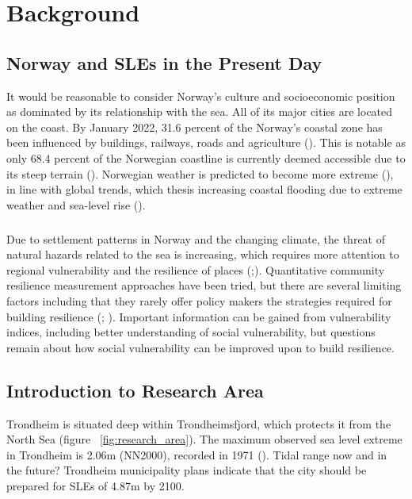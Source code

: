 \chapter{Background}

\section{Norway and SLEs in the Present Day}
 It would be reasonable to consider Norway's culture and socioeconomic position as dominated by its relationship with the sea. All of its major cities are located on the coast.  By January 2022, 31.6 percent of the Norway's coastal zone has been influenced by buildings, railways, roads and agriculture (\cite{engebakken_construction_2022}). This is notable as only 68.4 percent of the Norwegian coastline is currently deemed accessible due to its steep terrain (\cite{engebakken_construction_2022}). Norwegian weather is predicted to become more extreme (\cite{rod_integrated_2012}), in line with global trends, which thesis increasing coastal flooding due to extreme weather and sea-level rise (\cite{hoffken_effects_2020}). 
\paragraph{}

Due to settlement patterns in Norway and the changing climate, the threat of natural hazards related to the sea is increasing, which requires more attention to regional vulnerability and the resilience of places (\cite{opach_seeking_2020};\cite{rod_three_2015}). Quantitative community resilience measurement approaches have been tried, but there are several limiting factors including that they rarely offer policy makers the strategies required for building resilience (\cite{opach_seeking_2020}; \cite{gerkensmeier_governing_2018}). Important information can be gained from vulnerability indices, including better understanding of social vulnerability, but questions remain about how social vulnerability can be improved upon to build resilience. 


\section{Introduction to Research Area}

Trondheim is situated deep within Trondheimsfjord, which protects it from the North Sea (figure ~\ref{fig:research_area}). The maximum observed sea level extreme in Trondheim is 2.06m (NN2000), recorded in 1971 (\cite{tides_high_2022}).  Tidal range now and in the future? Trondheim municipality plans indicate that the city should be prepared for SLEs of 4.87m by 2100. 

